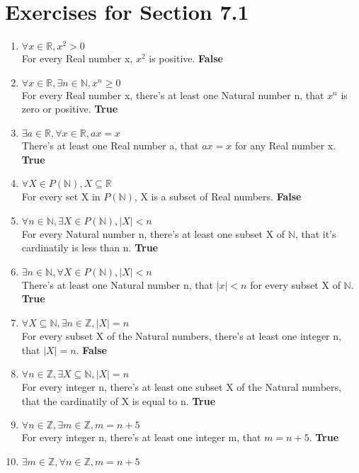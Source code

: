 \documentclass[12pt]{article}
\begin{document}
\section*{Exercises for Section 7.1}
\begin{enumerate}
    \item $\forall x \in \mathbb{R}, x^2 > 0$\\
	For every Real number x, $x^2$ is positive. \textbf{False}
    \item $\forall x \in \mathbb{R}, \exists n \in \mathbb{N}, x^n \ge 0$\\
	For every Real number x, there's at least one Natural number n, that $x^n$ is zero or positive. \textbf{True}
    \item $\exists a \in \mathbb{R}, \forall x \in \mathbb{R}, ax=x$\\
	There's at least one Real number a, that $ax=x$ for any Real number x. \textbf{True}
    \item $\forall X \in P(\mathbb{N}), X \subseteq \mathbb{R}$ \\
	For every set X in $P(\mathbb{N})$, X is a subset of Real numbers. \textbf{False}
    \item $\forall n \in \mathbb{N}, \exists X \in P(\mathbb{N}), |X| < n$\\
	For every Natural number n, there's at least one subset X of $\mathbb{N}$, that it's cardinatily is less than n. \textbf{True}
    \item $\exists n \in \mathbb{N}, \forall X \in P(\mathbb{N}), |X| < n$\\
    There's at least one Natural number n, that $|x| < n$ for every subset X of $\mathbb{N}$. \textbf{True}
    \item $\forall X \subseteq \mathbb{N}, \exists n \in \mathbb{Z}, |X| = n$\\
	For every subset X of the Natural numbers, there's at least one integer n, that $|X| = n$. \textbf{False}
    \item $\forall n \in \mathbb{Z}, \exists X \subseteq \mathbb{N}, |X| = n$\\
	For every integer n, there's at least one subset X of the Natural numbers, that the cardinatily of X is equal to n. \textbf{True}
    \item $\forall n \in \mathbb{Z}, \exists m \in \mathbb{Z}, m = n + 5$\\
	For every integer n, there's at least one integer m, that $m=n+5$. \textbf{True}
    \item $\exists m \in \mathbb{Z}, \forall n \in \mathbb{Z}, m = n+5$\\

\end{enumerate}
\end{document}

